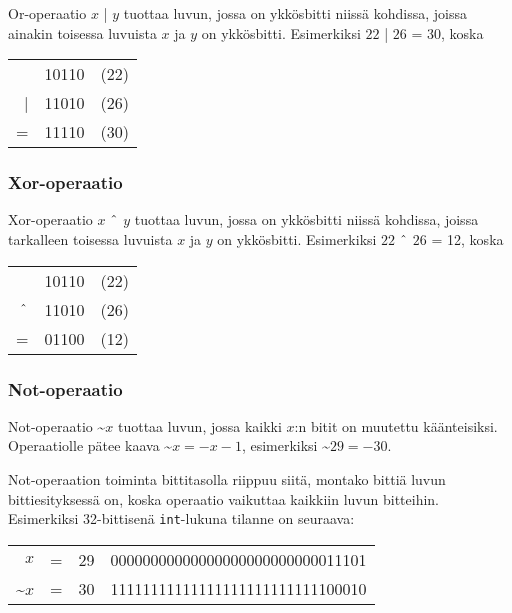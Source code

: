 
Or-operaatio $x$ | $y$ tuottaa luvun,
jossa on ykkösbitti niissä kohdissa,
joissa ainakin toisessa luvuista $x$ ja $y$ on ykkösbitti.
Esimerkiksi $22$ | $26$ = 30, koska

\begin{center}
\begin{tabular}{rrr}
& 10110 & (22)\\
| & 11010 & (26) \\
\hline
 = & 11110 & (30) \\
\end{tabular}
\end{center}

\subsubsection{Xor-operaatio}


Xor-operaatio $x$ $\XOR$ $y$ tuottaa luvun,
jossa on ykkösbitti niissä kohdissa,
joissa tarkalleen toisessa luvuista $x$ ja $y$ on ykkösbitti.
Esimerkiksi $22$ $\XOR$ $26$ = 12, koska

\begin{center}
\begin{tabular}{rrr}
& 10110 & (22)\\
$\XOR$ & 11010 & (26) \\
\hline
 = & 01100 & (12) \\
\end{tabular}
\end{center}

\subsubsection{Not-operaatio}


Not-operaatio \textasciitilde$x$ tuottaa luvun,
jossa kaikki $x$:n bitit on muutettu käänteisiksi.
Operaatiolle pätee kaava \textasciitilde$x = -x-1$,
esimerkiksi \textasciitilde$29 = -30$.

Not-operaation toiminta bittitasolla riippuu siitä,
montako bittiä luvun bittiesityksessä on,
koska operaatio vaikuttaa kaikkiin luvun bitteihin.
Esimerkiksi 32-bittisenä \texttt{int}-lukuna
tilanne on seuraava:

\begin{center}
\begin{tabular}{rrrr}
$x$ & = & 29 &   00000000000000000000000000011101 \\
\textasciitilde$x$ & = & 30 & 11111111111111111111111111100010 \\
\end{tabular}
\end{center}

